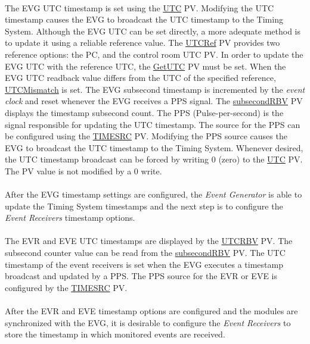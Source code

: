 \documentclass[openany]{article}
\begin{document}
		\paragraph{} The EVG UTC timestamp is set using the \hyperref[pvgroup:evg-timestamp]{UTC} PV. Modifying the UTC timestamp causes the EVG to broadcast the UTC timestamp to the Timing System. Although the EVG UTC can be set directly, a more adequate method is to update it using a reliable reference value. The \hyperref[pvgroup:evg-timestamp]{UTCRef} PV provides two reference options: the PC, and the control room UTC PV. In order to update the EVG UTC with the reference UTC, the \hyperref[pvgroup:evg-timestamp]{GetUTC} PV must be set. When the EVG UTC readback value differs from the UTC of the specified reference, \hyperref[pvgroup:evg-timestamp]{UTCMismatch} is set. The EVG subsecond timestamp is incremented by the \emph{event clock} and reset whenever the EVG receives a PPS signal. The \hyperref[pvgroup:evg-timestamp]{subsecondRBV} PV displays the timestamp subsecond count. The PPS (Pulse-per-second) is the signal responsible for updating the UTC timestamp. The source for the PPS can be configured using the \hyperref[pvgroup:evg-timestamp]{TIMESRC} PV. Modifying the PPS source causes the EVG to broadcast the UTC timestamp to the Timing System. Whenever desired, the UTC timestamp broadcast can be forced by writing 0 (zero) to the \hyperref[pvgroup:evg-timestamp]{UTC} PV. The PV value is not modified by a 0 write.
		\paragraph{} After the EVG timestamp settings are configured, the \emph{Event Generator} is able to update the Timing System timestamps and the next step is to configure the \emph{Event Receivers} timestamp options.
		\paragraph{} The EVR and EVE UTC timestamps are displayed by the \hyperref[pvgroup:evre-timestamp]{UTCRBV} PV. The subsecond counter value can be read from the \hyperref[pvgroup:evre-timestamp]{subsecondRBV} PV. The UTC timestamp of the event receivers is set when the EVG executes a timestamp broadcast and updated by a PPS. The PPS source for the EVR or EVE is configured by the \hyperref[pvgroup:evre-timestamp]{TIMESRC} PV.
		\paragraph{} After the EVR and EVE timestamp options are configured and the modules are synchronized with the EVG, it is desirable to configure the \emph{Event Receivers} to store the timestamp in which monitored events are received.
\end{document}
